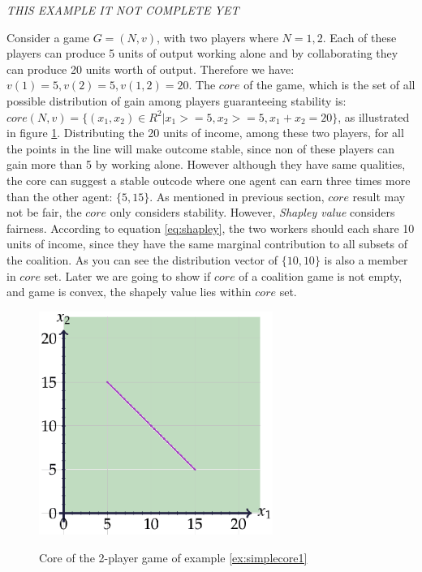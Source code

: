
            \emph {THIS EXAMPLE IT NOT COMPLETE YET}

            \begin{example}\label{ex:simplecore1}
                Consider a game $G = (N, v)$, with two players where $N = {1,2}$. Each of these players can produce 5 units of output working alone and by collaborating they can produce 20 units worth of output. Therefore we have: $v({1}) = 5, v({2}) = 5, v({1,2}) = 20$. The $core$ of the game, which is the set of all possible distribution of gain among players guaranteeing stability is: $core(N,v) = \{(x_1,x_2) \in R^2 | x_1 >= 5, x_2 >= 5, x_1 + x_2 = 20\}$, as illustrated in figure \ref{fig:coreex1}. Distributing the 20 units of income, among these two players, for all the points in the line will make outcome stable, since non of these players can gain more than 5 by working alone. However although they have same qualities, the core can suggest a stable outcode where one agent can earn three times more than the other agent: $\{5,15\}$. As mentioned in previous section, $core$ result may not be fair, the $core$ only considers stability. However, \emph{Shapley value} considers fairness. According to equation \ref{eq:shapley}, the two  workers should each share 10 units of income, since they have the same marginal contribution to all subsets of the coalition. As you can see the distribution vector of $\{10,10\}$ is also a member in $core$ set. Later we are going to show if $core$ of a coalition game is not empty, and game is convex, the shapely value lies within $core$ set.                
            \end{example}

            \begin{figure}
                \begin{center}
                \includegraphics[width=3in]{Figures/excore.eps}\label{fig:coreex1}
                \caption{Core of the 2-player game of example \ref{ex:simplecore1}}
                \end{center}
            \end{figure}
            

